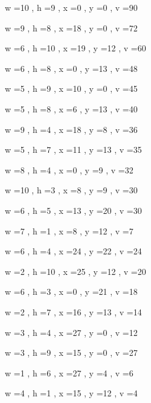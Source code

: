 \documentclass[11pt]{article}
\begin{document}
w =10 , h =9 , x =0 , y =0 , v =90
\par
w =9 , h =8 , x =18 , y =0 , v =72
\par
w =6 , h =10 , x =19 , y =12 , v =60
\par
w =6 , h =8 , x =0 , y =13 , v =48
\par
w =5 , h =9 , x =10 , y =0 , v =45
\par
w =5 , h =8 , x =6 , y =13 , v =40
\par
w =9 , h =4 , x =18 , y =8 , v =36
\par
w =5 , h =7 , x =11 , y =13 , v =35
\par
w =8 , h =4 , x =0 , y =9 , v =32
\par
w =10 , h =3 , x =8 , y =9 , v =30
\par
w =6 , h =5 , x =13 , y =20 , v =30
\par
w =7 , h =1 , x =8 , y =12 , v =7
\par
w =6 , h =4 , x =24 , y =22 , v =24
\par
w =2 , h =10 , x =25 , y =12 , v =20
\par
w =6 , h =3 , x =0 , y =21 , v =18
\par
w =2 , h =7 , x =16 , y =13 , v =14
\par
w =3 , h =4 , x =27 , y =0 , v =12
\par
w =3 , h =9 , x =15 , y =0 , v =27
\par
w =1 , h =6 , x =27 , y =4 , v =6
\par
w =4 , h =1 , x =15 , y =12 , v =4
\par
\newpage
\end{document}
